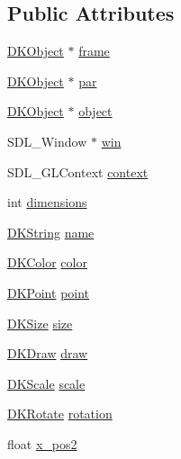 \subsection*{Public Attributes}
\begin{DoxyCompactItemize}
\item 
\hyperlink{class_d_k_object}{D\-K\-Object} $\ast$ \hyperlink{class_d_k_object_a52dfad9f7600a7ac9ab3045eee97c4b4}{frame}
\item 
\hyperlink{class_d_k_object}{D\-K\-Object} $\ast$ \hyperlink{class_d_k_object_a193d32a9735509b809b4e98b44c9c9bb}{par}
\item 
\hyperlink{class_d_k_object}{D\-K\-Object} $\ast$ \hyperlink{class_d_k_object_a1aac9df146f508fcb8f4e6a8183cc6c1}{object}
\item 
S\-D\-L\-\_\-\-Window $\ast$ \hyperlink{class_d_k_object_ac5b688e03db103f00ddef36f869a811a}{win}
\item 
S\-D\-L\-\_\-\-G\-L\-Context \hyperlink{class_d_k_object_a39c8018c47b7f5ec35c6ce0fa0079877}{context}
\item 
int \hyperlink{class_d_k_object_a1be0b89124027779a047f09dc76e7e59}{dimensions}
\item 
\hyperlink{_d_k_string_8h_ac168e8555ceba18e1a2919b21976bc84}{D\-K\-String} \hyperlink{class_d_k_object_a410e025d19c0ca7cec054bd76fd11ee7}{name}
\item 
\hyperlink{class_d_k_color}{D\-K\-Color} \hyperlink{class_d_k_object_a2a19bb0038eb4cef7ea506982be57706}{color}
\item 
\hyperlink{_d_k_axis_8h_a0ca1f005fbb936f8e7a7f2433591f418}{D\-K\-Point} \hyperlink{class_d_k_object_a463118c0f9a97079921c010186328084}{point}
\item 
\hyperlink{_d_k_axis_8h_aaa25a8c7cbf504fffdb8a4208ff7a731}{D\-K\-Size} \hyperlink{class_d_k_object_a6778fb4fc08efb5b06201d9fd3c26670}{size}
\item 
\hyperlink{_d_k_axis_8h_afbfe380691d74858a70844ea1ef9dea8}{D\-K\-Draw} \hyperlink{class_d_k_object_aec9a7c6780b18134a4b99d63974d6571}{draw}
\item 
\hyperlink{_d_k_axis_8h_ab9e555d97d32f68d4c77474d1e1ba787}{D\-K\-Scale} \hyperlink{class_d_k_object_adbfd51763bde0e20d96a7f81096fb130}{scale}
\item 
\hyperlink{_d_k_axis_8h_a886498401ce03ee3a95cb58785ab475a}{D\-K\-Rotate} \hyperlink{class_d_k_object_af0cb5cd47e201d090f0677f95a55c00b}{rotation}
\item 
float \hyperlink{class_d_k_object_a0334370403d259b84c21d2c01d4da86c}{x\-\_\-pos2}

\end{DoxyCompactItemize}
